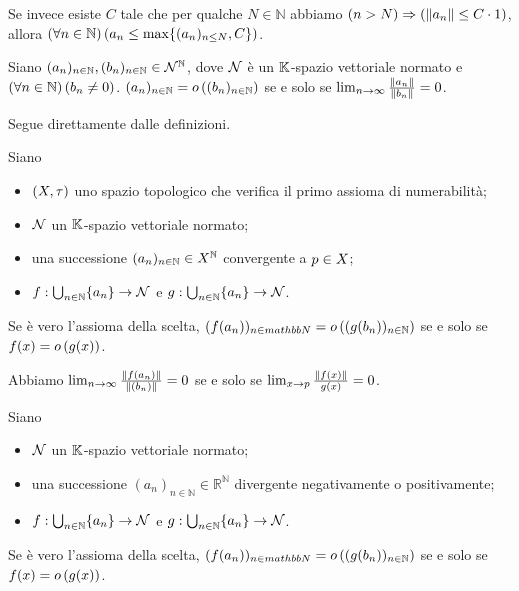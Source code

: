 \par Se invece esiste $C$ tale che per qualche $N \in \mathbb{N}$ abbiamo $\Implies{n > N}{\Norm{a_n} \leq C \cdot 1}$, allora $\left ( \forall n \in \mathbb{N} \right ) \left ( a_n \leq \max \lbrace (a_n)_{n \leq N}, C \rbrace \right )$. \EndProof
\begin{Theorem}
	Siano $(a_n)_{n \in \mathbb{N}}, (b_n)_{n \in \mathbb{N}} \in \mathcal{N}^{\mathbb{N}}$, dove $\mathcal{N}$ \`e un $\mathbb{K}$-spazio vettoriale normato e $\left ( \forall n \in \mathbb{N} \right ) \left ( b_n \neq 0 \right )$. $(a_n)_{n \in \mathbb{N}} = o \left ( (b_n)_{n \in \mathbb{N}} \right )$ se e solo se $\lim_{n \rightarrow \infty} \frac{\Norm{a_n}}{\Norm{b_n}} = 0$.
\end{Theorem}
\Proof Segue direttamente dalle definizioni. \EndProof
\begin{Corollary}
	\par Siano
	\begin{itemize}
		\item $(X,\tau)$ uno spazio topologico che verifica il primo assioma di numerabilit\`a;
		\item $\mathcal{N}$ un $\mathbb{K}$-spazio vettoriale normato;
		\item una successione $(a_n)_{n \in \mathbb{N}} \in X^\mathbb{N}$ convergente a $p \in X$;
		\item $f: \bigcup_{n \in \mathbb{N}} \lbrace a_n \rbrace \rightarrow \mathcal{N}$ e $g: \bigcup_{n \in \mathbb{N}} \lbrace a_n \rbrace \rightarrow \mathcal{N}$.
	\end{itemize}
	Se \`e vero l'assioma della scelta, $(f(a_n))_{n \in mathbb{N}} = o \left ( (g(b_n))_{n \in \mathbb{N}} \right )$ se e solo se $f(x) = o \left ( g(x) \right )$.
\end{Corollary}
\Proof Abbiamo $\lim_{n \rightarrow \infty} \frac{\Norm{f(a_n)}}{\Norm{(b_n)}} = 0$ se e solo se $\lim_{x \rightarrow \AccumulationPoint} \frac{\Norm{f(x)}}{g(x)} = 0$. \EndProof
\begin{Corollary}
	\par Siano
	\begin{itemize}
		\item $\mathcal{N}$ un $\mathbb{K}$-spazio vettoriale normato;
		\item una successione $(a_n)_{n \in \mathbb{N}} \in \mathbb{R}^\mathbb{N}$ divergente negativamente o positivamente;
		\item $f: \bigcup_{n \in \mathbb{N}} \lbrace a_n \rbrace \rightarrow \mathcal{N}$ e $g: \bigcup_{n \in \mathbb{N}} \lbrace a_n \rbrace \rightarrow \mathcal{N}$.
	\end{itemize}
	Se \`e vero l'assioma della scelta, $(f(a_n))_{n \in mathbb{N}} = o \left ( (g(b_n))_{n \in \mathbb{N}} \right )$ se e solo se $f(x) = o \left ( g(x) \right )$.
\end{Corollary}
